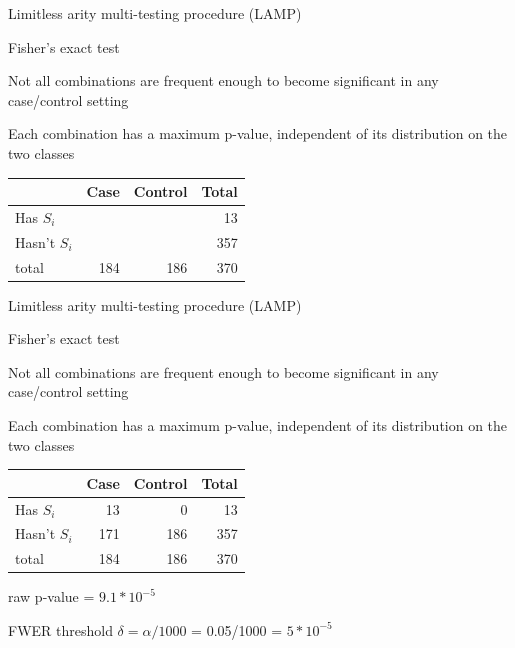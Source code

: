 \documentclass[ignorenonframetext,]{beamer}
\begin{document}
\begin{frame}{Limitless arity multi-testing procedure (LAMP)}

\begin{block}{Fisher's exact test}

Not all combinations are frequent enough to become significant in any
case/control setting

\pause

Each combination has a maximum p-value, independent of its distribution
on the two classes

\pause

\begin{longtable}[]{@{}lrrr@{}}
\toprule
& Case & Control & Total\tabularnewline
\midrule
\endhead
Has \(S_i\) & & & 13\tabularnewline
Hasn't \(S_i\) & & & 357\tabularnewline
total & 184 & 186 & 370\tabularnewline
\bottomrule
\end{longtable}

\end{block}

\end{frame}

\begin{frame}{Limitless arity multi-testing procedure (LAMP)}

\begin{block}{Fisher's exact test}

Not all combinations are frequent enough to become significant in any
case/control setting

Each combination has a maximum p-value, independent of its distribution
on the two classes

\begin{longtable}[]{@{}lrrr@{}}
\toprule
& Case & Control & Total\tabularnewline
\midrule
\endhead
Has \(S_i\) & 13 & 0 & 13\tabularnewline
Hasn't \(S_i\) & 171 & 186 & 357\tabularnewline
total & 184 & 186 & 370\tabularnewline
\bottomrule
\end{longtable}

\pause

raw p-value = \(9.1*10^{-5}\)

\pause

FWER threshold \(\delta=\alpha/1000\) = 0.05/1000 = \(5*10^{-5}\)

\end{block}

\end{frame}
\end{document}
